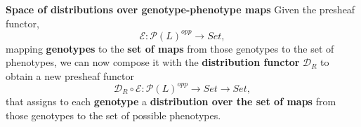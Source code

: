 \begin{frame}
\begin{block}{\textbf{Space of distributions over genotype-phenotype maps}}
Given the presheaf functor, 
$$\mathcal{E} \colon \mathcal{P}(L)^{opp} \rightarrow Set,$$
mapping \textbf{genotypes} to the \textbf{set of maps} from those genotypes to the set of phenotypes, we can now compose it with the \textbf{distribution functor} $\mathcal{D}_R$ to obtain a new presheaf functor 
$$\mathcal{D}_R \circ \mathcal{E} \colon \mathcal{P}(L)^{opp} \rightarrow Set \rightarrow Set,$$
that assigns to each \textbf{genotype} a \textbf{distribution over the set of maps} from those genotypes to the set of possible phenotypes.
\end{block}
\end{frame}